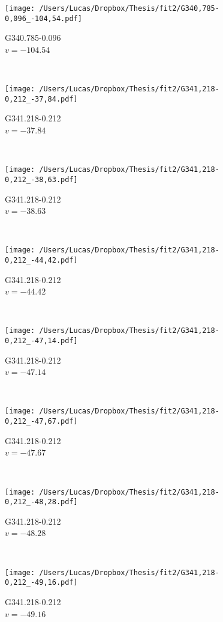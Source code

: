 \begin{figure*}[t]\ContinuedFloat
	\centering
	\begin{subfigure}[t]{0.3\textwidth}
		\texttt{[image: /Users/Lucas/Dropbox/Thesis/fit2/G340,785-0,096\_-104,54.pdf]}
		\caption[]{G340.785-0.096\\$v=-104.54$\,\kms}
	\end{subfigure}
	~
	\begin{subfigure}[t]{0.3\textwidth}
		\texttt{[image: /Users/Lucas/Dropbox/Thesis/fit2/G341,218-0,212\_-37,84.pdf]}
		\caption[]{G341.218-0.212\\$v=-37.84$\,\kms}
	\end{subfigure}
	~
	\begin{subfigure}[t]{0.3\textwidth}
		\texttt{[image: /Users/Lucas/Dropbox/Thesis/fit2/G341,218-0,212\_-38,63.pdf]}
		\caption[]{G341.218-0.212\\$v=-38.63$\,\kms}
	\end{subfigure}
	~
	\begin{subfigure}[t]{0.3\textwidth}
		\texttt{[image: /Users/Lucas/Dropbox/Thesis/fit2/G341,218-0,212\_-44,42.pdf]}
		\caption[]{G341.218-0.212\\$v=-44.42$\,\kms}
	\end{subfigure}
	~
	\begin{subfigure}[t]{0.3\textwidth}
		\texttt{[image: /Users/Lucas/Dropbox/Thesis/fit2/G341,218-0,212\_-47,14.pdf]}
		\caption[]{G341.218-0.212\\$v=-47.14$\,\kms}
	\end{subfigure}
	~
	\begin{subfigure}[t]{0.3\textwidth}
		\texttt{[image: /Users/Lucas/Dropbox/Thesis/fit2/G341,218-0,212\_-47,67.pdf]}
		\caption[]{G341.218-0.212\\$v=-47.67$\,\kms}
	\end{subfigure}
	~
	\begin{subfigure}[t]{0.3\textwidth}
		\texttt{[image: /Users/Lucas/Dropbox/Thesis/fit2/G341,218-0,212\_-48,28.pdf]}
		\caption[]{G341.218-0.212\\$v=-48.28$\,\kms}
	\end{subfigure}
	~
	\begin{subfigure}[t]{0.3\textwidth}
		\texttt{[image: /Users/Lucas/Dropbox/Thesis/fit2/G341,218-0,212\_-49,16.pdf]}
		\caption[]{G341.218-0.212\\$v=-49.16$\,\kms}

\end{subfigure}
\end{figure*}

